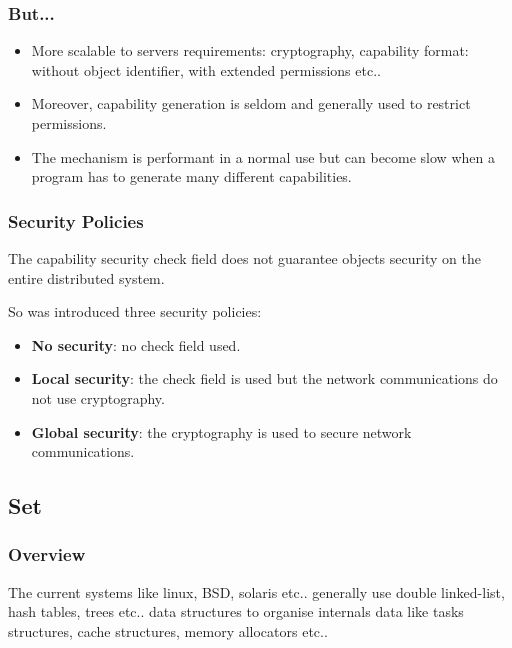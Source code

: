 {%

\begin{frame}
  \frametitle{But...}

  \begin{itemize}[<+->]
    \item
      More scalable to servers requirements: cryptography,
      capability format: without object identifier, with extended
      permissions etc..
    \item
      Moreover, capability generation is seldom and generally used
      to restrict permissions.
    \item
      The mechanism is performant in a normal use but can become
      slow when a program has to generate many different capabilities.
  \end{itemize}
\end{frame}


\begin{frame}
  \frametitle{Security Policies}

  The capability security check field does not guarantee objects security on
  the entire distributed system.

  \nl

  So was introduced three security policies:

  \begin{itemize}[<+->]
    \item
      \textbf{No security}: no check field used.
    \item
      \textbf{Local security}: the check field is used but the
      network communications do not use cryptography.
    \item
      \textbf{Global security}: the cryptography is used to secure
      network communications.
  \end{itemize}
\end{frame}

%
%

\subsection{Set}


\begin{frame}
  \frametitle{Overview}

  The current systems like linux, BSD, solaris etc.. generally use
  double linked-list, hash tables, trees etc.. data structures to
  organise internals data like tasks structures, cache structures,
  memory allocators etc..


\end{frame}}
